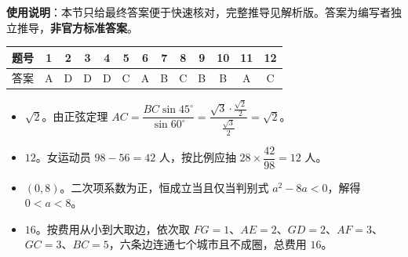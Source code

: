 
\begin{gknotice}
\textbf{使用说明}：本节只给最终答案便于快速核对，完整推导见解析版。答案为编写者独立推导，\textbf{非官方标准答案}。
\end{gknotice}

\begin{center}\begin{tabular}{ccccccccccccc}
\toprule
题号 & 1 & 2 & 3 & 4 & 5 & 6 & 7 & 8 & 9 & 10 & 11 & 12 \\
\midrule
答案 & A & D & D & D & C & A & B & C & B & B & A & C \\
\bottomrule
\end{tabular}\end{center}

\begin{itemize}[leftmargin=2.6em]
  \item[\textbf{13.}] $\sqrt2$。由正弦定理 $AC=\dfrac{BC\sin45^\circ}{\sin60^\circ}=\dfrac{\sqrt3\cdot\frac{\sqrt2}2}{\frac{\sqrt3}2}=\sqrt2$。
  \item[\textbf{14.}] $12$。女运动员 $98-56=42$ 人，按比例应抽 $28\times\dfrac{42}{98}=12$ 人。
  \item[\textbf{15.}] $(0,8)$。二次项系数为正，恒成立当且仅当判别式 $a^2-8a<0$，解得 $0<a<8$。
  \item[\textbf{16.}] $16$。按费用从小到大取边，依次取 $FG=1$、$AE=2$、$GD=2$、$AF=3$、$GC=3$、$BC=5$，六条边连通七个城市且不成圈，总费用 $16$。
\end{itemize}

